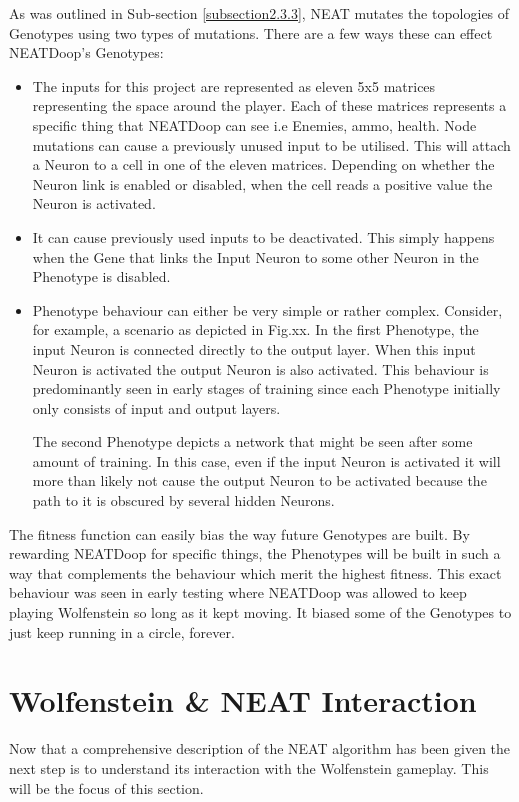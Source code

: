 \documentclass[]{Learning-to-Play-Wolfenstein-thesis}
\begin{document}
As was outlined in Sub-section \ref{subsection2.3.3}, NEAT mutates the topologies of Genotypes using two types of mutations. There are a few ways these can effect NEATDoop's Genotypes:
\begin{itemize}
\item The inputs for this project are represented as eleven 5x5 matrices representing the space around the player. Each of these matrices represents a specific thing that NEATDoop can see i.e Enemies, ammo, health. Node mutations can cause a previously unused input to be utilised. This will attach a Neuron to a cell in one of the eleven matrices. Depending on whether the Neuron link is enabled or disabled, when the cell reads a positive value the Neuron is activated. 
\item It can cause previously used inputs to be deactivated. This simply happens when the Gene that links the Input Neuron to some other Neuron in the Phenotype is disabled.
\item Phenotype behaviour can either be very simple or rather complex. Consider, for example, a scenario as depicted in Fig.xx. In the first Phenotype, the input Neuron is connected directly to the output layer. When this input Neuron is activated the output Neuron is also activated. This behaviour is predominantly seen in early stages of training since each Phenotype initially only consists of input and output layers. 

The second Phenotype depicts a network that might be seen after some amount of training. In this case, even if the input Neuron is activated it will more than likely not cause the output Neuron to be activated because the path to it is obscured by several hidden Neurons. 
\end{itemize}

The fitness function can easily bias the way future Genotypes are built. By rewarding NEATDoop for specific things, the Phenotypes will be built in such a way that complements the behaviour which merit the highest fitness. This exact behaviour was seen in early testing where NEATDoop was allowed to keep playing Wolfenstein so long as it kept moving. It biased some of the Genotypes to just keep running in a circle, forever. 

\section{Wolfenstein \& NEAT Interaction}
Now that a comprehensive description of the NEAT algorithm has been given the next step is to understand its interaction with the Wolfenstein gameplay. This will be the focus of this section. 
\end{document}
